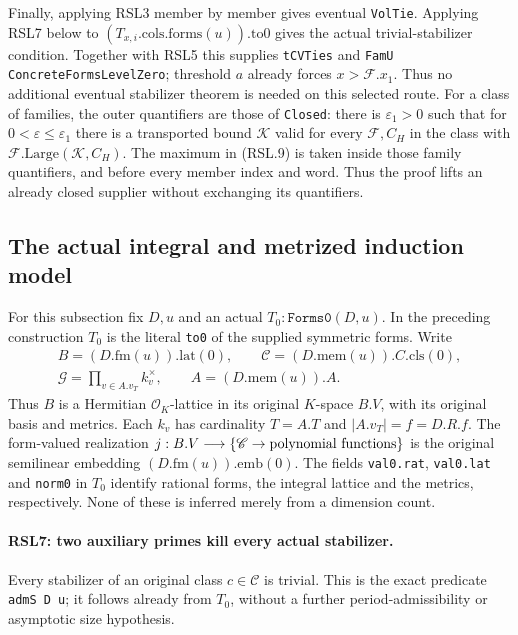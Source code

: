 Finally, applying RSL3 member by member gives eventual
\texttt{VolTie}.  Applying RSL7 below to
$(T_{x,i}.\mathrm{cols}.\mathrm{forms}(u)).\mathrm{to0}$ gives
the actual trivial-stabilizer condition.  Together with RSL5
this supplies \texttt{tCVTies} and
\texttt{FamU ConcreteFormsLevelZero}; threshold $a$ already
forces $x>\mathcal F.x_1$.  Thus no additional eventual
stabilizer theorem is needed on this selected route.  For a
class of families, the outer quantifiers are those of
\texttt{Closed}: there is $\varepsilon_1>0$ such that for
$0<\varepsilon\le\varepsilon_1$ there is a transported bound
$\mathcal K$ valid for every $\mathcal F,C_H$ in the class
with $\mathcal F.\mathrm{Large}(\mathcal K,C_H)$.
The maximum in (RSL.9) is taken inside those family quantifiers,
and before every member index and word.  Thus the proof lifts
an already closed supplier without exchanging its quantifiers.

\subsection{The actual integral and metrized induction model}

For this subsection fix $D,u$ and an actual
$T_0:\texttt{Forms0}(D,u)$.  In the preceding construction $T_0$
is the literal \texttt{to0} of the supplied symmetric forms.  Write
\[
 \begin{gathered}
 B=(D.\mathrm{fm}(u)).\mathrm{lat}(0),\qquad
 \mathscr C=(D.\mathrm{mem}(u)).C.\mathrm{cls}(0),\\
 \mathscr G=\prod_{v\in A.v_T} k_v^\times,
 \qquad A=(D.\mathrm{mem}(u)).A.
 \end{gathered}
                                                                  \tag{RSL.11}
\]
Thus $B$ is a Hermitian $\mathcal O_K$-lattice in its original
$K$-space $B.V$, with its original basis and metrics.  Each $k_v$
has cardinality $T=A.T$ and $|A.v_T|=f=D.R.f$.  The form-valued
realization $j:B.V\longrightarrow\{
\mathscr C\to\hbox{polynomial functions}\}$ is the original
semilinear embedding $(D.\mathrm{fm}(u)).\mathrm{emb}(0)$.
The fields \texttt{val0.rat}, \texttt{val0.lat} and
\texttt{norm0} in $T_0$ identify rational forms, the integral
lattice and the metrics, respectively.  None of these is inferred
merely from a dimension count.

\paragraph{RSL7: two auxiliary primes kill every actual stabilizer.}
\label{claim:RSL7}
Every stabilizer of an original class $c\in\mathscr C$ is trivial.
This is the exact predicate \texttt{admS D u}; it follows already
from $T_0$, without a further period-admissibility or asymptotic
size hypothesis.

